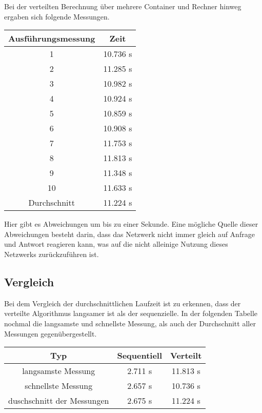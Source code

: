 Bei der verteilten Berechnung über mehrere Container und Rechner hinweg ergaben sich folgende Messungen.

\begin{center}
    \begin{tabular}{ |c|c| }
        \hline
        Ausführungsmessung & Zeit     \\
        \hline
        1                  & 10.736 s \\
        2                  & 11.285 s \\
        3                  & 10.982 s \\
        4                  & 10.924 s \\
        5                  & 10.859 s \\
        6                  & 10.908 s \\
        7                  & 11.753 s \\
        8                  & 11.813 s \\
        9                  & 11.348 s \\
        10                 & 11.633 s \\
        \hline
        Durchschnitt       & 11.224 s \\
        \hline
    \end{tabular}
\end{center}

Hier gibt es Abweichungen um bis zu einer Sekunde. Eine mögliche Quelle dieser Abweichungen besteht darin, dass das
Netzwerk nicht immer gleich auf Anfrage und Antwort reagieren kann, was auf die nicht alleinige Nutzung dieses Netzwerks
zurückzuführen ist.

\subsection{Vergleich}

Bei dem Vergleich der durchschnittlichen Laufzeit ist zu erkennen, dass der verteilte Algorithmus langsamer ist als der
sequenzielle. In der folgenden Tabelle nochmal die langsamste und schnellste Messung, als auch der Durchschnitt aller
Messungen gegenübergestellt.

\begin{center}
    \begin{tabular}{ |c|c|c| }
        \hline
        Typ                        & Sequentiell & Verteilt \\
        \hline
        langsamste Messung         & 2.711 s     & 11.813 s \\
        schnellste Messung         & 2.657 s     & 10.736 s \\
        duschschnitt der Messungen & 2.675 s     & 11.224 s \\
        \hline
    \end{tabular}
\end{center}

